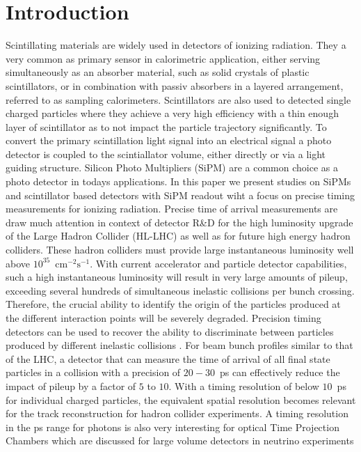 \section{Introduction}

Scintillating materials are widely used in detectors of ionizing radiation. 
They a very common as primary sensor in calorimetric application, either serving simultaneously as an absorber material, such as solid crystals of plastic scintillators, or in combination with passiv absorbers in a layered arrangement, referred to as sampling calorimeters. Scintillators are also used to detected single charged particles where they achieve a very high efficiency with a thin enough layer of scintillator as to not impact the particle trajectory significantly.
To convert the primary scintillation light signal into an electrical signal a photo detector is coupled to the scintiallator volume, either directly or via a light guiding structure.
Silicon Photo Multipliers (SiPM) are a common choice as a photo detector in todays applications.
In this paper we present studies on SiPMs and scintillator based detectors with SiPM readout wiht a focus on precise timing measurements for ionizing radiation. 
%
%
Precise time of arrival measurements are draw much attention in context of detector R\&D for the high luminosity upgrade of the Large Hadron Collider (HL-LHC) as well as for future high energy hadron colliders.  
These hadron colliders must provide large 
instantaneous luminosity well above $10^{35}$~$\mathrm{cm}^{-2}\mathrm{s}^{-1}$.
With current accelerator and particle detector capabilities, such a high 
instantaneous luminosity will result in very large amounts
of pileup, exceeding several hundreds of simultaneous inelastic collisions per
bunch crossing. Therefore, the crucial ability to identify the origin 
of the particles produced at the different interaction points will be severely 
degraded. Precision timing detectors can be used to recover the ability to 
discriminate between particles produced by different inelastic collisions \cite{adielba}.
For beam bunch profiles similar to that of the LHC, a detector 
that can measure the time of arrival of all final state particles in a collision
with a precision of $20-30$~ps can effectively reduce the impact of
pileup by a factor of $5$ to $10$. 
%
% 
% 
With a timing resolution of below $10$~ps for individual charged particles, the equivalent spatial 
resolution becomes relevant for the track reconstruction \cite{4dtracking} for hadron collider experiments.
A timing resolution in the ps range for photons is also very interesting for optical Time Projection Chambers which are discussed for large volume detectors in neutrino experiments \cite{lappd, otpc} 
%
%
%


